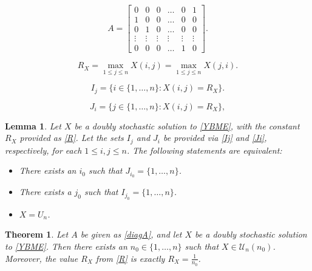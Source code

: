 \documentclass[10pt,a4paper]{amsart}
\newtheorem{lemma}{Lemma}
\newtheorem{theorem}{Theorem}
\def\U{{\mathcal{U}}}
\begin{document}
	\begin{equation}
		\label{diagA}
		A=\left[\begin{array}{cccccc}
			0 & 0 & 0 & \ldots & 0 & 1\\
			1 & 0 & 0 &\ldots & 0 & 0\\
			0 & 1 & 0 & \ldots & 0 & 0 \\
			\vdots & \vdots& \vdots& \vdots& \vdots &\vdots\\
			0 & 0 & 0 &\ldots & 1 & 0
		\end{array}\right].
	\end{equation}

		\begin{equation}
			\label{R} R_X=\max_{1\leq j\leq n} X(i,j)=\max_{1\leq j\leq n} X(j,i).
		\end{equation}

	\begin{equation}
		\label{Ij}I_{j}=\{i\in\{1,\ldots,n\}: X(i,j)=R_X\}.
	\end{equation}

	\begin{equation}
		\label{Ji}J_{i}=\{j\in\{1,\ldots,n\}: X(i,j)=R_X\},
	\end{equation}

	\begin{lemma}\label{emptycomplements} Let $X$ be a doubly stochastic solution to \eqref{YBME}, with the constant $R_X$ provided as \eqref{R}. Let the sets $I_j$ and $J_i$ be provided via \eqref{Ij} and \eqref{Ji}, respectively, for each $1\leq i,j\leq n$. The following statements are equivalent:
		\begin{itemize}
			\item[(a)] There exists an $i_0$ such that $J_{i_0}=\{1,\ldots,n\}$.
			\item[(b)] There exists a $j_0$ such that $I_{j_0}=\{1,\ldots,n\}$.
			\item[(c)] $X=U_n$.
		\end{itemize}
	\end{lemma}

	\begin{theorem}\label{udmus}
		Let $A$ be given as \eqref{diagA}, and let $X$ be a doubly stochastic solution to \eqref{YBME}. Then there exists an $n_0\in\{1,\ldots,n\}$ such that $X\in\U_n(n_0)$. Moreover, the value $R_X$ from \eqref{R} is exactly $R_X=\frac{1}{n_0}$.
	\end{theorem}
\end{document}
